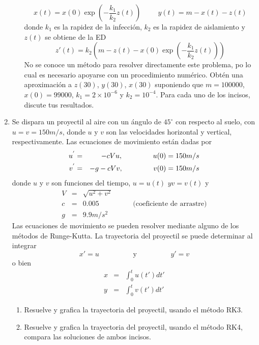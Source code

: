 \documentclass[11pt]{article}
\begin{document}
\begin{enumerate}
\begin{enumerate}
\[ x(t) = x(0) \exp\left(- \frac{k_{1}}{k_{2}}z(t)\right) \hspace{1cm} y(t) =m - x(t) - z(t) \]
donde $k_{1}$ es la rapidez de la infección, $k_{2}$ es la rapidez de aislamiento y $z(t)$ se obtiene de la ED
\[ z'(t) = k_{2} \left( m - z(t) - x(0) \exp \left( - \frac{k_{1}}{k_{2}} z(t) \right) \right)\]
No se conoce un método para resolver directamente este problema, po lo cual es necesario apoyarse con un procedimiento numérico. Obtén una aproximación a $z(30)$, $y(30)$, $x(30)$ suponiendo que $m=100000$, $x(0)=99000$, $k_{1} = 2 \times 10^{-6}$ y $k_{2} = 10^{-4}$. Para cada uno de los incisos, discute tus resultados.
\end{enumerate}
\item Se dispara un proyectil al aire con un ángulo de $45^{\circ}$ con respecto al suelo, con $u=v=150 m/s$, donde $u$ y $v$ son las velocidades horizontal y vertical, respectivamente. Las ecuaciones de movimiento están dadas por
\begin{eqnarray*}
u^{'} & = & -c Vu, \hspace{1.5cm} u(0)=150 m/s \\
v^{'} & = & -g - cVv, \hspace{1.5cm} v(0)=150 m/s
\end{eqnarray*}
donde $u$ y $v$ son funciones del tiempo, $u=u(t)$ $y v=v(t)$ y
\begin{eqnarray*}
V & = & \sqrt{u^{2} + v^{2}} \\
c & = & 0.005 \hspace{2cm} \text{(coeficiente de arrastre)} \\
g & = & 9.9 m/s^{2}
\end{eqnarray*}
Las ecuaciones de movimiento se pueden resolver mediante alguno de los métodos de Runge-Kutta. La trayectoria del proyectil se puede determinar al integrar
\[ x' = u \hspace{2cm} \text{y} \hspace{2cm} y' = v \]
o bien
\begin{eqnarray*}
x & = & \int^{t}_{0} u(t') dt' \\
y & = & \int^{t}_{0} v(t') dt'
\end{eqnarray*}
\begin{enumerate}
\item Resuelve y grafica la trayectoria del proyectil, usando el método RK3.
\item Resuelve y grafica la trayectoria del proyectil, usando el método RK4, compara las soluciones de ambos incisos.
\end{enumerate}

\end{enumerate}
\end{document}

